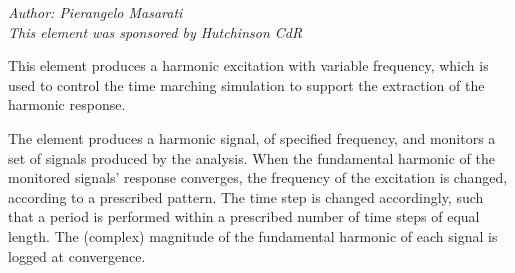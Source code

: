 % 
% 
% 
% 
% 
% 
% 
% 
% 

%
%


\emph{Author: Pierangelo Masarati} \\
\emph{This element was sponsored by Hutchinson CdR}

\bigskip

This element produces a harmonic excitation with variable frequency, which is used to control the time marching simulation to support the extraction of the harmonic response.

The element produces a harmonic signal, of specified frequency, and monitors a set of signals produced by the analysis.
When the fundamental harmonic of the monitored signals' response converges, the frequency of the excitation is changed, according to a prescribed pattern.
The time step is changed accordingly, such that a period is performed within a prescribed number of time steps of equal length.
The (complex) magnitude of the fundamental harmonic of each signal is logged at convergence.

